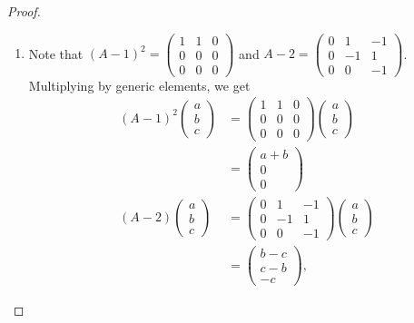 \documentclass[12pt]{article}
\theoremstyle{definition}
\begin{document}
\begin{proof}\
	\begin{enumerate}[label=(\alph*)]
		\item Note that $(A-1)^2 = \begin{pmatrix}1 & 1 & 0\\0 & 0 & 0\\0 & 0 & 0\end{pmatrix}$ and $A-2 = \begin{pmatrix}0 & 1 & -1 \\ 0 & -1 & 1 \\ 0 & 0 & -1\end{pmatrix}$.
		      Multiplying by generic elements, we get \begin{align*}
			      (A-1)^2\begin{pmatrix} a \\ b \\ c \end{pmatrix} & = \begin{pmatrix}1 & 1 & 0\\0 & 0 & 0\\0 & 0 & 0\end{pmatrix} \begin{pmatrix} a \\ b \\ c \end{pmatrix}        \\
			                                                       & = \begin{pmatrix}a + b \\ 0 \\ 0\end{pmatrix}                                                                  \\
			      (A-2)\begin{pmatrix} a \\ b \\ c \end{pmatrix}   & = \begin{pmatrix}0 & 1 & -1 \\ 0 & -1 & 1 \\ 0 & 0 & -1\end{pmatrix} \begin{pmatrix} a \\ b \\ c \end{pmatrix} \\
			                                                       & = \begin{pmatrix}b - c \\ c - b \\ -c\end{pmatrix},

\end{align*}
\end{enumerate}
\end{proof}
\end{document}
